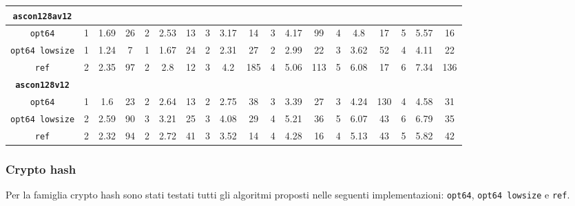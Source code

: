 \begin{landscape}
\begin{table}[]
\begin{adjustbox}{width=600pt}
\begin{tabular}{|c|c|c|c|c|c|c|c|c|c|c|c|c|c|c|c|c|c|c|}
				\hline
				\texttt{\textbf{ascon128av12}} & & & & & & & & & & & & & & & & & & \\
				\hline
				\texttt{opt64} & 1 & 1.69 & 26 & 2 & 2.53 & 13 & 3 & 3.17 & 14 & 3 & 4.17 & 99 & 4 & 4.8 & 17 & 5 & 5.57 & 16 \\
				\hline
				\texttt{opt64 lowsize} & 1 & 1.24 & 7 & 1 & 1.67 & 24 & 2 & 2.31 & 27 & 2 & 2.99 & 22 & 3 & 3.62 & 52 & 4 & 4.11 & 22 \\
				\hline
				\texttt{ref} & 2 & 2.35 & 97 & 2 & 2.8 & 12 & 3 & 4.2 & 185 & 4 & 5.06 & 113 & 5 & 6.08 & 17 & 6 & 7.34 & 136 \\
				\hline
				\texttt{\textbf{ascon128v12}} & & & & & & & & & & & & & & & & & & \\
				\hline
				\texttt{opt64} & 1 & 1.6 & 23 & 2 & 2.64 & 13 & 2 & 2.75 & 38 & 3 & 3.39 & 27 & 3 & 4.24 & 130 & 4 & 4.58 & 31 \\
				\hline
				\texttt{opt64 lowsize} & 2 & 2.59 & 90 & 3 & 3.21 & 25 & 3 & 4.08 & 29 & 4 & 5.21 & 36 & 5 & 6.07 & 43 & 6 & 6.79 & 35 \\
				\hline
				\texttt{ref} & 2 & 2.32 & 94 & 2 & 2.72 & 41 & 3 & 3.52 & 14 & 4 & 4.28 & 16 & 4 & 5.13 & 43 & 5 & 5.82 & 42 \\
				\hline
			\end{tabular}
		\end{adjustbox}
	\end{table}
\end{landscape}

\subsubsection{Crypto hash}

Per la famiglia crypto hash sono stati testati tutti gli algoritmi proposti nelle seguenti implementazioni: \texttt{opt64}, \texttt{opt64 lowsize} e \texttt{ref}.

